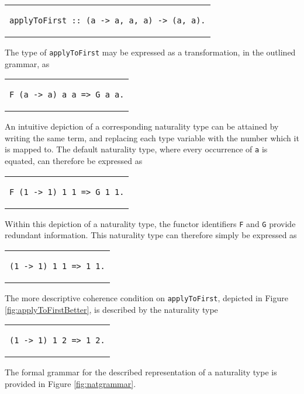 \documentclass[../Dissertation.tex]{subfiles}
\begin{document}
\begin{center}
\begin{tabular}{c}
\begin{lstlisting}
applyToFirst :: (a -> a, a, a) -> (a, a).
\end{lstlisting}
\end{tabular}
\end{center}
The type of \lstinline{applyToFirst} may be expressed as a transformation, in the outlined grammar, as
\begin{center}
\begin{tabular}{c}
\begin{lstlisting}
F (a -> a) a a => G a a.
\end{lstlisting}
\end{tabular}
\end{center}
An intuitive depiction of a corresponding naturality type can be attained by writing the same term, and replacing each type variable with the number which it is mapped to. The default naturality type, where every occurrence of \lstinline{a} is equated, can therefore be expressed as 
\begin{center}
\begin{tabular}{c}
\begin{lstlisting}
F (1 -> 1) 1 1 => G 1 1.
\end{lstlisting}
\end{tabular}
\end{center}
Within this depiction of a naturality type, the functor identifiers \lstinline{F} and \lstinline{G} provide redundant information. This naturality type can therefore simply be expressed as
\begin{center}
\begin{tabular}{c}
\begin{lstlisting}
(1 -> 1) 1 1 => 1 1.
\end{lstlisting}
\end{tabular}
\end{center}
The more descriptive coherence condition on \lstinline{applyToFirst}, depicted in Figure \ref{fig:applyToFirstBetter}, is described by the naturality type
\begin{center}
\begin{tabular}{c}
\begin{lstlisting}
(1 -> 1) 1 2 => 1 2.
\end{lstlisting}
\end{tabular}
\end{center}
\par
The formal grammar for the described representation of a naturality type is provided in Figure \ref{fig:natgrammar}.
\end{document}
